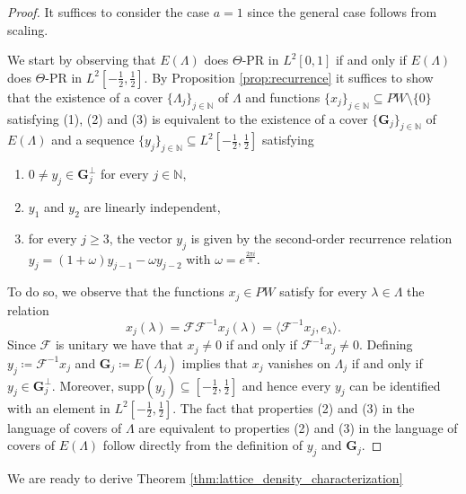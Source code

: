 \documentclass[reqno,a4paper,11pt]{amsart}
\numberwithin{equation}{section}
\def\N{{\mathbb N}}
\newcommand{\supp}{{\mathrm{supp}}}
\newcommand\1{\mathds{1}}
\newcommand{\ift}{{\mathcal{F}^{-1}}}
\newcommand{\ft}{{\mathcal{F}}}
\begin{document}
\begin{proof}
    It suffices to consider the case $a=1$ since the general case follows from scaling.
    
    We start by observing that $E(\Lambda)$ does $\Theta$-PR in $L^2[0,1]$ if and only if $E(\Lambda)$ does $\Theta$-PR in $L^2[-\frac{1}{2},\frac{1}{2}]$. By Proposition \ref{prop:recurrence} it suffices to show that the existence of a cover $\{\Lambda_j\}_{j \in \N}$ of $\Lambda$ and functions $\{ x_j \}_{j \in \N} \subseteq PW \setminus \{ 0 \}$ satisfying (1), (2) and (3) is equivalent to the existence of a cover $\{\mathbf{G}_j\}_{j \in \N}$ of $E(\Lambda)$ and a sequence $\{ y_j \}_{j \in \N} \subseteq L^2[-\frac{1}{2},\frac{1}{2}]$ satisfying
\begin{enumerate}
        \item $0 \neq y_j \in \mathbf{G}_j^\perp$ for every $j\in \N$,
        \item $y_1$ and $y_2$ are linearly independent,
        \item for every $j \geq 3$, the vector $y_j$ is given by the second-order recurrence relation $y_j = (1+\omega)y_{j-1} - \omega y_{j-2}$ with $\omega = e^{\frac{2\pi i }{n}}$.
    \end{enumerate}

    To do so, we observe that the functions $x_j \in PW$ satisfy for every $\lambda \in \Lambda$ the relation
    \begin{equation}\label{eq:reformulation}
        x_j(\lambda) = \ft \ift x_j(\lambda) = \langle \ift x_j, e_\lambda \rangle.
    \end{equation}
    Since $\ft$ is unitary we have that $x_j \neq 0$ if and only if $\ift x_j \neq 0$. Defining $y_j \coloneqq \ift x_j$ and $\mathbf{G}_j \coloneqq E(\Lambda_j)$ implies that $x_j$ vanishes on $\Lambda_j$ if and only if $y_j \in \mathbf{G}_j^\perp$. Moreover, $\supp(y_j) \subseteq [-\frac{1}{2},\frac{1}{2}]$ and hence every $y_j$ can be identified with an element in $L^2[-\frac{1}{2},\frac{1}{2}]$. The fact that properties (2) and (3) in the language of covers of $\Lambda$ are equivalent to properties (2) and (3) in the language of covers of $E(\Lambda)$ follow directly from the definition of $y_j$ and $\mathbf{G}_j$.
\end{proof}

We are ready to derive Theorem \ref{thm:lattice_density_characterization}
\end{document}
